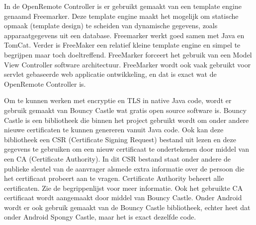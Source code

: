\documentclass[]{article}
\begin{document}
In de OpenRemote Controller is er gebruikt gemaakt van een template engine
genaamd Freemarker. Deze template engine maakt het mogelijk om statische
opmaak (template design) te scheiden van dynamische gegevens, zoals apparaatgegevens
uit een database. Freemarker werkt goed samen met Java en TomCat.
Verder is FreeMaker een relatief kleine template engine en simpel te
begrijpen maar toch doeltreffend. FreeMarker forceert het gebruik
van een Model View Controller software architectuur. FreeMarker wordt ook
vaak gebruikt voor servlet gebaseerde web applicatie ontwikkeling, en dat is
exact wat de OpenRemote Controller is.

Om te kunnen werken met encryptie en TLS in native Java code, wordt er gebruik
gemaakt van Bouncy Castle wat gratis open source software is.  Bouncy Castle is
een bibliotheek die binnen het project gebruikt wordt om onder andere nieuwe
certificaten te kunnen genereren vanuit Java code. Ook kan deze bibliotheek een
CSR (Certificate Signing Request) bestand uit lezen en deze gegevens te
gebruiken om een nieuw certificaat te ondertekenen door middel van een CA
(Certificate Authority). In dit CSR bestand staat onder andere de publieke
sleutel van de aanvrager alsmede extra informatie over de persoon die het
certificaat probeert aan te vragen.  Certificate Authority beheert alle
certificaten. Zie de begrippenlijst voor meer informatie. Ook het gebruikte CA
certificaat wordt aangemaakt door middel van Bouncy Castle. Onder Android wordt
er ook gebruik gemaakt van de Bouncy Castle bibliotheek, echter heet dat onder
Android Spongy Castle, maar het is exact dezelfde code.
\end{document}

